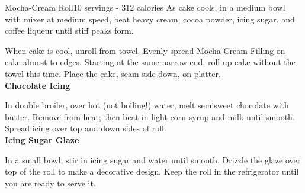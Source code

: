 \begin{recipe}{Mocha-Cream Roll}{10 servings - 312 calories}{}
As cake cools, in a medium bowl with mixer at medium speed, beat heavy cream, cocoa powder, icing sugar, and coffee liqueur until stiff peaks form.

When cake is cool, unroll from towel. Evenly spread Mocha-Cream Filling on cake almost to edges. Starting at the same narrow end, roll up cake without the towel this time. Place the cake, seam side down, on platter.\\

\textbf{Chocolate Icing}

In double broiler, over hot (not boiling!) water, melt semisweet chocolate with butter. Remove from heat; then beat in light corn syrup and milk until smooth. Spread icing over top and down sides of roll.\\

\textbf{Icing Sugar Glaze}

In a small bowl, stir in icing sugar and water until smooth. Drizzle the glaze over top of the roll to make a decorative design. Keep the roll in the refrigerator until you are ready to serve it.

\end{recipe}